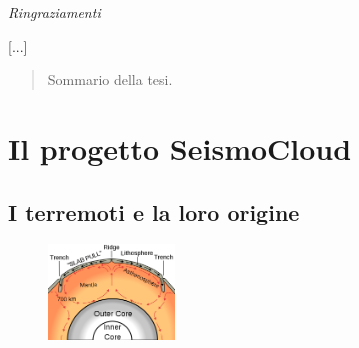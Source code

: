 \documentclass[a4paper,10pt]{memoir}
\begin{document}
  
  
\frontmatter


\maketitle
\cleardoublepage




\LARGE \textsl{Ringraziamenti}

\normalsize
[...]

\cleardoublepage

\begin{abstract}
	\thispagestyle{plain}
	Sommario della tesi.
\end{abstract}
\cleardoublepage

\tableofcontents
\cleardoublepage

\mainmatter

\renewcommand\chapterheadstart{}
\renewcommand\printchaptername{}
\renewcommand\chapternamenum{}
\renewcommand\printchapternum{}
\renewcommand\afterchapternum{}
\renewcommand\printchaptertitle[1]{\chaptitlefont \thechapter. \space #1}

\chapter{Il progetto SeismoCloud}

\section{I terremoti e la loro origine}


\begin{figure}
\includegraphics[width=0.30\textwidth]{introduzione/oceanic_spreading}
\end{figure}
\end{document}
